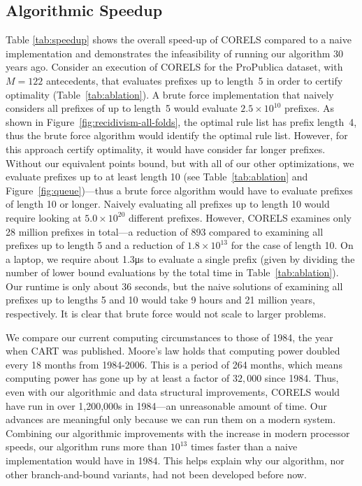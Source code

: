 \subsection{Algorithmic Speedup}
%
Table \ref{tab:speedup} shows the overall speed-up of CORELS compared to a naive implementation and demonstrates the infeasibility of running
our algorithm 30 years ago.
%
Consider an execution of CORELS for the ProPublica dataset, with ${M = 122}$ antecedents,
that evaluates prefixes up to length~5 in order to certify optimality (Table~\ref{tab:ablation}).
%
A brute force implementation that naively considers all prefixes of up to length~5
would evaluate ${2.5 \times 10^{10}}$ prefixes.
%
As shown in Figure~\ref{fig:recidivism-all-folds}, the optimal rule list has prefix length~4,
thus the brute force algorithm would identify the optimal rule list.
%
However, for this approach certify optimality, it would have consider far longer prefixes.
%
Without our equivalent points bound, but with all of our other optimizations,
we evaluate prefixes up to at least length 10
(see Table~\ref{tab:ablation} and Figure~\ref{fig:queue})---thus a brute force algorithm
would have to evaluate prefixes of length 10 or longer.
%
Naively evaluating all prefixes up to length 10 would require looking at $5.0 \times 10^{20}$ different prefixes.
%
However, CORELS examines only 28 million prefixes in total---a reduction of 893 compared to examining all prefixes up to length 5 and a reduction of $1.8 \times 10^{13}$ for the case of length 10.
%
On a laptop, we require about 1.3μs to evaluate a single prefix (given by dividing the number of lower bound evaluations by the total time
in Table~\ref{tab:ablation}). 
%
Our runtime is only about 36 seconds, but the naive solutions of examining all prefixes up to lengths 5 and 10 would take 9 hours and 21 million years, respectively. 
%
It is clear that brute force would not scale to larger problems.

We compare our current computing circumstances to those of 1984, the year when CART was published.
%
Moore's law holds that computing power doubled every 18 months from 1984-2006.
%
This is a period of 264 months, which means computing power has gone up by at least a factor of $32,000$ since 1984.
%
Thus, even with our algorithmic and data structural improvements, CORELS would have run in over 1,200,000s in 1984---an unreasonable amount of time.
%
Our advances are meaningful only because we can run them on a modern system.
%
Combining our algorithmic improvements with the increase in modern processor speeds, our algorithm runs more than $10^{13}$ times faster than a naive implementation would have in 1984.
%
This helps explain why our algorithm, nor other branch-and-bound variants, had not been developed before now.

